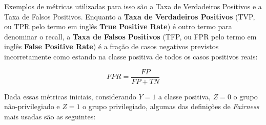 \documentclass[portugues]{ic-tese}
\begin{document}
Exemplos de métricas utilizadas para isso são a Taxa de Verdadeiros Positivos e a Taxa de Falsos Positivos. Enquanto a \textbf{Taxa de Verdadeiros Positivos} (TVP, ou TPR pelo termo em inglês \textbf{True Positive Rate}) é outro termo para denominar o recall, a \textbf{Taxa de Falsos Positivos} (TFP, ou FPR pelo termo em inglês \textbf{False Positive Rate}) é a fração de casos negativos previstos incorretamente como estando na classe positiva de todos os casos positivos reais:

\begin{equation}
FPR = \frac{FP}{FP + TN}
\end{equation}

Dada essas métricas iniciais, considerando $Y=1$ a classe positiva, $Z=0$ o grupo não-privilegiado e $Z=1$ o grupo privilegiado, algumas das definições de \textit{Fairness} mais usadas são as seguintes:
\end{document}

